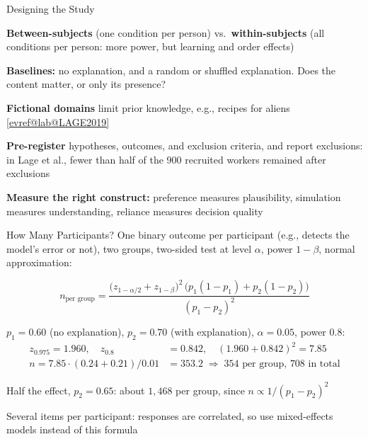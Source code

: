 \documentclass[10pt,compress,t,notes=noshow,xcolor=table]{beamer}
\makeatletter
\newcommand{\citeref}[1]{%
  \href{\csname evref@url@#1\endcsname}{[\csname evref@lab@#1\endcsname]}}
\makeatother
\begin{document}
\begin{framev}[align=top]{Designing the Study}
\begin{itemizeM}
\item \textbf{Between-subjects} (one condition per person) vs.\ \textbf{within-subjects} (all conditions per person: more power, but learning and order effects)
\item \textbf{Baselines:} no explanation, and a random or shuffled explanation. Does the content matter, or only its presence?
\item \textbf{Fictional domains} limit prior knowledge, e.g., recipes for aliens \citeref{LAGE2019}
\item \textbf{Pre-register} hypotheses, outcomes, and exclusion criteria, and report exclusions: in Lage et al., fewer than half of the 900 recruited workers remained after exclusions
\item \textbf{Measure the right construct:} preference measures plausibility, simulation measures understanding, reliance measures decision quality
\end{itemizeM}
\end{framev}


\begin{framev}[align=top]{How Many Participants?}
One binary outcome per participant (e.g., detects the model's error or not), two groups, two-sided test at level $\alpha$, power $1-\beta$, normal approximation:
\begin{definition}
\[n_{\text{per group}} = \frac{\big(z_{1-\alpha/2} + z_{1-\beta}\big)^2\,\big(p_1(1-p_1) + p_2(1-p_2)\big)}{(p_1 - p_2)^2}\]
\end{definition}
\begin{example}
$p_1 = 0.60$ (no explanation), $p_2 = 0.70$ (with explanation), $\alpha = 0.05$, power $0.8$:
\begin{align*}
z_{0.975} = 1.960, \quad z_{0.8} &= 0.842, \quad (1.960 + 0.842)^2 = 7.85\\
n = 7.85 \cdot (0.24 + 0.21)/0.01 &= 353.2 \;\Rightarrow\; 354 \text{ per group, } 708 \text{ in total}
\end{align*}
\end{example}
\pause
\begin{itemizeS}
\item Half the effect, $p_2 = 0.65$: about $1{,}468$ per group, since $n \propto 1/(p_1 - p_2)^2$
\item Several items per participant: responses are correlated, so use mixed-effects models instead of this formula
\end{itemizeS}
\end{framev}
\end{document}
